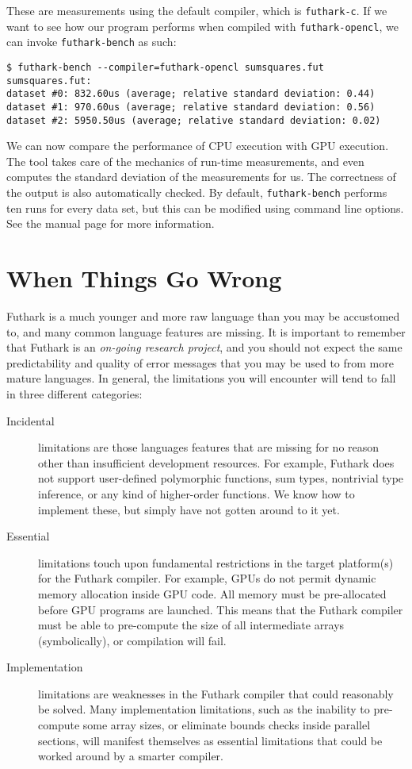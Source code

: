 \documentclass[oneside,11pt]{book}
\begin{document}
These are measurements using the default compiler, which is
\texttt{futhark-c}.  If we want to see how our program performs when
compiled with \texttt{futhark-opencl}, we can invoke
\texttt{futhark-bench} as such:

\begin{verbatim}
$ futhark-bench --compiler=futhark-opencl sumsquares.fut
sumsquares.fut:
dataset #0: 832.60us (average; relative standard deviation: 0.44)
dataset #1: 970.60us (average; relative standard deviation: 0.56)
dataset #2: 5950.50us (average; relative standard deviation: 0.02)
\end{verbatim}

We can now compare the performance of CPU execution with GPU
execution.  The tool takes care of the mechanics of run-time
measurements, and even computes the standard deviation of the
measurements for us.  The correctness of the output is also
automatically checked.  By default, \texttt{futhark-bench} performs
ten runs for every data set, but this can be modified using command
line options.  See the manual page for more information.

\section{When Things Go Wrong}

Futhark is a much younger and more raw language than you may be
accustomed to, and many common language features are missing.  It is
important to remember that Futhark is an \textit{on-going research
  project}, and you should not expect the same predictability and
quality of error messages that you may be used to from more mature
languages.  In general, the limitations you will encounter will tend
to fall in three different categories:

\begin{description}
\item[Incidental] limitations are those languages features that are
  missing for no reason other than insufficient development resources.
  For example, Futhark does not support user-defined polymorphic
  functions, sum types, nontrivial type inference, or any kind of
  higher-order functions.  We know how to implement these, but simply
  have not gotten around to it yet.

\item[Essential] limitations touch upon fundamental restrictions in
  the target platform(s) for the Futhark compiler.  For example, GPUs
  do not permit dynamic memory allocation inside GPU code.  All memory
  must be pre-allocated before GPU programs are launched.  This means
  that the Futhark compiler must be able to pre-compute the size of
  all intermediate arrays (symbolically), or compilation will fail.

\item[Implementation] limitations are weaknesses in the Futhark
  compiler that could reasonably be solved.  Many implementation
  limitations, such as the inability to pre-compute some array sizes,
  or eliminate bounds checks inside parallel sections, will manifest
  themselves as essential limitations that could be worked around by a
  smarter compiler.
\end{description}
\end{document}
